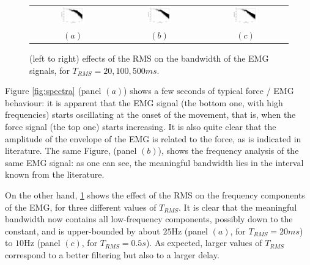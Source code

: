 \begin{figure}[!ht] \centering
  \begin{tabular}{ccc}
    \includegraphics[width=0.3\textwidth]{figs/spectrum_RMS0040} &
    \includegraphics[width=0.3\textwidth]{figs/spectrum_RMS0200} &
    \includegraphics[width=0.3\textwidth]{figs/spectrum_RMS1000} \\
    $(a)$ & $(b)$ & $(c)$ \\
  \end{tabular}
  \caption{(left to right) effects of the RMS on the bandwidth of the EMG
    signals, for $T_{RMS} = 20, 100, 500ms$.}
  \label{fig:RMSs}
\end{figure}

Figure \ref{fig:spectra} (panel $(a)$) shows a few seconds of typical
force / EMG behaviour: it is apparent that the EMG signal (the bottom
one, with high frequencies) starts oscillating at the onset of the
movement, that is, when the force signal (the top one) starts
increasing. It is also quite clear that the amplitude of the envelope
of the EMG is related to the force, as is indicated in literature. The
same Figure, (panel $(b)$), shows the frequency analysis of the same EMG
signal: as one can see, the meaningful bandwidth lies in the interval
known from the literature.

On the other hand, \ref{fig:RMSs} shows the effect of the RMS on the
frequency components of the EMG, for three different values of
$T_{RMS}$. It is clear that the meaningful bandwidth now contains all
low-frequency components, possibly down to the constant, and is
upper-bounded by about $25$Hz (panel $(a)$, for $T_{RMS}=20ms$) to
$10$Hz (panel $(c)$, for $T_{RMS}=0.5s$). As expected, larger values
of $T_{RMS}$ correspond to a better filtering but also to a larger
delay.

